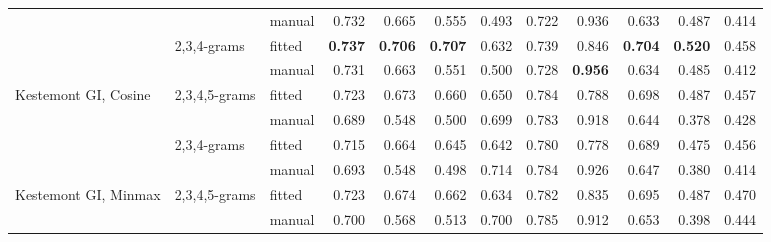 \documentclass[
    hf
]{ceurart}
\begin{document}
\begin{table}
\begin{adjustbox}{max width=\textwidth}
\begin{tabular}{lllrrrrrrrrr}
                                                      &                                     & manual  & 0.732          & 0.665          & 0.555          & 0.493          & 0.722          & 0.936          & 0.633          & 0.487          & 0.414          \\
                                                      & \multirow[c]{2}{*}{ 2,3,4-grams }   & fitted  & \textbf{0.737} & \textbf{0.706} & \textbf{0.707} & 0.632          & 0.739          & 0.846          & \textbf{0.704} & \textbf{0.520} & 0.458          \\
                                                      &                                     & manual  & 0.731          & 0.663          & 0.551          & 0.500          & 0.728          & \textbf{0.956} & 0.634          & 0.485          & 0.412          \\
            \multirow[c]{4}{*}{Kestemont GI, Cosine } & \multirow[c]{2}{*}{ 2,3,4,5-grams } & fitted  & 0.723          & 0.673          & 0.660          & 0.650          & 0.784          & 0.788          & 0.698          & 0.487          & 0.457          \\
                                                      &                                     & manual  & 0.689          & 0.548          & 0.500          & 0.699          & 0.783          & 0.918          & 0.644          & 0.378          & 0.428          \\
                                                      & \multirow[c]{2}{*}{ 2,3,4-grams }   & fitted  & 0.715          & 0.664          & 0.645          & 0.642          & 0.780          & 0.778          & 0.689          & 0.475          & 0.456          \\
                                                      &                                     & manual  & 0.693          & 0.548          & 0.498          & 0.714          & 0.784          & 0.926          & 0.647          & 0.380          & 0.414          \\
            \multirow[c]{4}{*}{Kestemont GI, Minmax } & \multirow[c]{2}{*}{ 2,3,4,5-grams } & fitted  & 0.723          & 0.674          & 0.662          & 0.634          & 0.782          & 0.835          & 0.695          & 0.487          & 0.470          \\
                                                      &                                     & manual  & 0.700          & 0.568          & 0.513          & 0.700          & 0.785          & 0.912          & 0.653          & 0.398          & 0.444          \\

\end{tabular}
\end{adjustbox}
\end{table}
\end{document}
